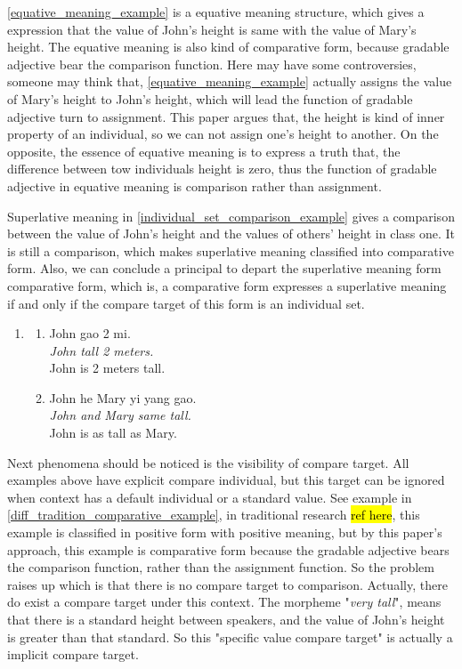\documentclass{ctexart}
\begin{document}
\ref{equative_meaning_example} is a equative meaning structure, which gives a expression that the value of John's height is same with the value of Mary's height. The equative meaning is also kind of comparative form, because gradable adjective bear the comparison function. Here may have some controversies, someone may think that, \ref{equative_meaning_example} actually assigns the value of Mary's height to John's height, which will lead the function of gradable adjective turn to assignment. This paper argues that, the height is kind of inner property of an individual, so we can not assign one's height to another. On the opposite, the essence of equative meaning is to express a truth that, the difference between tow individuals height is zero, thus the function of gradable adjective in equative meaning is comparison rather than assignment.

Superlative meaning in \ref{individual_set_comparison_example} gives a comparison between the value of John's height and the values of others' height in class one. It is still a comparison, which makes superlative meaning classified into comparative form. Also, we can conclude a principal to depart the superlative meaning form comparative form, which is, a comparative form expresses a superlative meaning if and only if the compare target of this form is an individual set.

\begin{enumerate}[resume]
    \item
    \begin{enumerate}[ref=(\arabic{enumi}\alph*)]
        \item \label{positive_meaning_example}
        John gao 2 mi.\\
        \textit{John tall 2 meters.} \\
        John is 2 meters tall.

        \item \label{equative_meaning_example}
        John he Mary yi yang gao.\\
        \textit{John and Mary same tall.}\\
        John is as tall as Mary.

    \end{enumerate}
\end{enumerate}

Next phenomena should be noticed is the visibility of compare target. All examples above have explicit compare individual, but this target can be ignored when context has a default individual or a standard value. See example in \ref{diff_tradition_comparative_example}, in traditional research \hl{ref here}, this example is classified in positive form with positive meaning, but by this paper's approach, this example is comparative form because the gradable adjective bears the comparison function, rather than the assignment function. So the problem raises up which is that there is no compare target to comparison. Actually, there do exist a compare target under this context. The morpheme "\textit{very tall}", means that there is a standard height between speakers, and the value of John's height is greater than that standard. So this "specific value compare target" is actually a implicit compare target.
\end{document}
